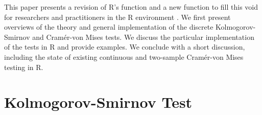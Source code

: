 This paper presents a revision of R's
 function and a new  function to
fill this void for researchers and practitioners in the R environment
\citep{R2010}. 
We first present overviews of the theory and general implementation of the
discrete Kolmogorov-Smirnov and Cram\'{e}r-von Mises tests.  We discuss
the particular implementation of the tests in R and provide examples.  We
conclude with a short discussion, including the state of existing continuous
and two-sample Cram\'{e}r-von Mises testing in R.





\section{Kolmogorov-Smirnov Test}


